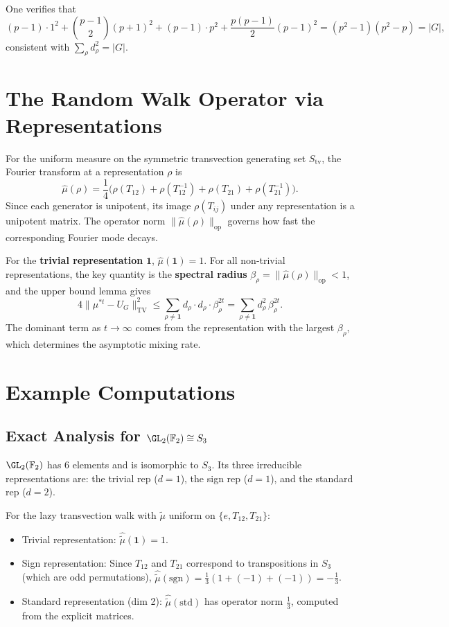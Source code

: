 One verifies that
\[
  (p-1) \cdot 1^2
  + \binom{p-1}{2}(p+1)^2
  + (p-1) \cdot p^2
  + \frac{p(p-1)}{2}(p-1)^2
  = (p^2-1)(p^2-p)
  = |G|,
\]
consistent with $\sum_\rho d_\rho^2 = |G|$.

\section{The Random Walk Operator via Representations}

For the uniform measure on the symmetric transvection generating set $S_{\mathrm{tv}}$,
the Fourier transform at a representation $\rho$ is
\[
  \hat\mu(\rho) = \frac{1}{4}\bigl(\rho(T_{12}) + \rho(T_{12}^{-1}) + \rho(T_{21}) + \rho(T_{21}^{-1})\bigr).
\]
Since each generator is unipotent, its image $\rho(T_{ij})$ under any
representation is a unipotent matrix.
The operator norm $\|\hat\mu(\rho)\|_{\mathrm{op}}$ governs how fast the
corresponding Fourier mode decays.

For the \textbf{trivial representation} $\mathbf{1}$, $\hat\mu(\mathbf{1}) = 1$.
For all non-trivial representations, the key quantity is the \textbf{spectral
radius} $\beta_\rho = \|\hat\mu(\rho)\|_{\mathrm{op}} < 1$, and the upper bound
lemma gives
\[
  4\|\mu^{*t} - U_G\|_{\mathrm{TV}}^2
  \leq \sum_{\rho \neq \mathbf{1}} d_\rho \cdot d_\rho \cdot \beta_\rho^{2t}
  = \sum_{\rho \neq \mathbf{1}} d_\rho^2\,\beta_\rho^{2t}.
\]
The dominant term as $t \to \infty$ comes from the representation with the
largest $\beta_\rho$, which determines the asymptotic mixing rate.

\section{Example Computations}

\subsection{Exact Analysis for $\GL_2(\mathbb{F}_2) \cong S_3$}

$\GL_2(\mathbb{F}_2)$ has 6 elements and is isomorphic to $S_3$.
Its three irreducible representations are: the trivial rep ($d = 1$), the sign
rep ($d = 1$), and the standard rep ($d = 2$).

For the lazy transvection walk with $\tilde\mu$ uniform on $\{e, T_{12}, T_{21}\}$:
\begin{itemize}
  \item Trivial representation: $\hat{\tilde\mu}(\mathbf{1}) = 1$.
  \item Sign representation: Since $T_{12}$ and $T_{21}$ correspond to
        transpositions in $S_3$ (which are odd permutations),
        $\hat{\tilde\mu}(\mathrm{sgn}) = \frac{1}{3}(1 + (-1) + (-1)) = -\frac{1}{3}$.
  \item Standard representation (dim 2): $\hat{\tilde\mu}(\mathrm{std})$
        has operator norm $\frac{1}{3}$, computed from the explicit matrices.
\end{itemize}

